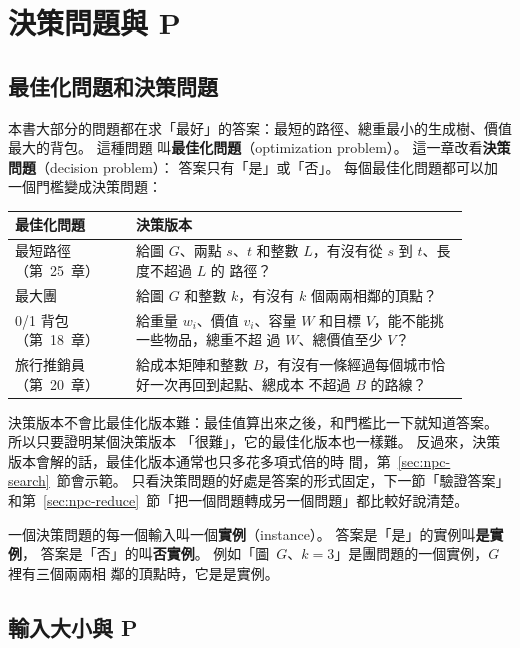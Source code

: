 \section{決策問題與 P}
\label{sec:npc-decision}

\subsection{最佳化問題和決策問題}

本書大部分的問題都在求「最好」的答案：最短的路徑、總重最小的生成樹、價值最大的背包。 這種問題
叫\textbf{最佳化問題}（optimization problem）。 這一章改看\textbf{決策問題}（decision problem）：
答案只有「是」或「否」。 每個最佳化問題都可以加一個門檻變成決策問題：

\begin{center}
\begin{tabular}{p{0.24\linewidth}p{0.66\linewidth}}
\toprule
最佳化問題 & 決策版本 \\
\midrule
最短路徑（第~25~章）& 給圖 $G$、兩點 $s$、$t$ 和整數 $L$，有沒有從 $s$ 到 $t$、長度不超過 $L$ 的
路徑？ \\
最大團 & 給圖 $G$ 和整數 $k$，有沒有 $k$ 個兩兩相鄰的頂點？ \\
0/1 背包（第~18~章）& 給重量 $w_i$、價值 $v_i$、容量 $W$ 和目標 $V$，能不能挑一些物品，總重不超
過 $W$、總價值至少 $V$？ \\
旅行推銷員（第~20~章）& 給成本矩陣和整數 $B$，有沒有一條經過每個城市恰好一次再回到起點、總成本
不超過 $B$ 的路線？ \\
\bottomrule
\end{tabular}
\end{center}

決策版本不會比最佳化版本難：最佳值算出來之後，和門檻比一下就知道答案。 所以只要證明某個決策版本
「很難」，它的最佳化版本也一樣難。 反過來，決策版本會解的話，最佳化版本通常也只多花多項式倍的時
間，第~\ref{sec:npc-search}~節會示範。 只看決策問題的好處是答案的形式固定，下一節「驗證答案」
和第~\ref{sec:npc-reduce}~節「把一個問題轉成另一個問題」都比較好說清楚。

一個決策問題的每一個輸入叫一個\textbf{實例}（instance）。 答案是「是」的實例叫\textbf{是實例}，
答案是「否」的叫\textbf{否實例}。 例如「圖~$G$、$k = 3$」是團問題的一個實例，$G$ 裡有三個兩兩相
鄰的頂點時，它是是實例。

\subsection{輸入大小與 P}

